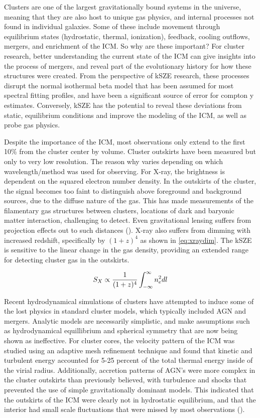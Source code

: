 \documentclass[manuscript]{aastex}
\begin{document}
Clusters are one of the largest gravitationally bound systems in the universe, meaning that they are also host to unique gas physics, and internal processes not found in individual galaxies. Some of these include movement through equilibrium states (hydrostatic, thermal, ionization), feedback, cooling outflows, mergers, and enrichment of the ICM. So why are these important? For cluster research, better understanding the current state of the ICM can give insights into the process of mergers, and reveal part of the evolutionary history for how these structures were created. From the perspective of kSZE research, these processes disrupt the normal isothermal beta model that has been assumed for most spectral fitting profiles, and have been a significant source of error for compton y estimates. Conversely, kSZE has the potential to reveal these deviations from static, equilibrium conditions and improve the modeling of the ICM, as well as probe gas physics. 

Despite the importance of the ICM, most observations only extend to the first 10\% from the cluster center by volume. Cluster outskirts have been measured but only to very low resolution. The reason why varies depending on which wavelength/method was used for observing. For X-ray, the brightness is dependent on the squared electron number density. In the outskirts of the cluster, the signal becomes too faint to distinguish above foreground and background sources, due to the diffuse nature of the gas.  This has made measurements of the filamentary gas structures between clusters, locations of dark and baryonic matter interaction, challenging to detect. Even gravitational lensing suffers from projection effects out to such distances (\cite{Reiprich2013}). X-ray also suffers from dimming with increased redshift, specifically by \((1+z)^{4}\) as shown in \ref{eq:xraydim}. The kSZE is sensitive to the linear change in the gas density, providing an extended range for detecting cluster gas in the outskirts. 

\begin{equation}\label{eq:xraydim}
S_{X} \propto \frac{1}{(1+z)^4} \Large\int^{\infty}_{-\infty}  n_{e}^{2} dl
\end{equation}

Recent hydrodynamical simulations of clusters have attempted to induce some of the lost physics in standard cluster models, which typically included AGN and mergers. Analytic models are necessarily simplistic,  and make assumptions such as hydrodynamical equillibrium and spherical symmetry that are now being shown as ineffective. For cluster cores, the velocity pattern of the ICM was studied using an adaptive mesh refinement technique and found that kinetic and turbulent energy accounted for 5-25 percent of the total thermal energy inside of the virial radius. Additionally, accretion patterns of AGN's were more complex in the cluster outskirts than previously believed, with turbulence and shocks that prevented the use of simple gravitationally dominant models. This indicated that the outskirts of the ICM were clearly not in hydrostatic equilibrium, and that the interior had small scale fluctuations that were missed by most observations (\cite{Reiprich2013}).  
\end{document}
